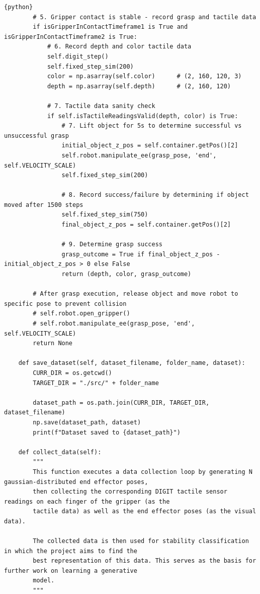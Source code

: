 \documentclass[11pt, a4paper]{report}
\begin{document}
\begin{lstlisting}{python}
        # 5. Gripper contact is stable - record grasp and tactile data
        if isGripperInContactTimeframe1 is True and isGripperInContactTimeframe2 is True:
            # 6. Record depth and color tactile data
            self.digit_step()
            self.fixed_step_sim(200)
            color = np.asarray(self.color)      # (2, 160, 120, 3)
            depth = np.asarray(self.depth)      # (2, 160, 120)

            # 7. Tactile data sanity check
            if self.isTactileReadingsValid(depth, color) is True:
                # 7. Lift object for 5s to determine successful vs unsuccessful grasp
                initial_object_z_pos = self.container.getPos()[2]
                self.robot.manipulate_ee(grasp_pose, 'end', self.VELOCITY_SCALE)
                self.fixed_step_sim(200)

                # 8. Record success/failure by determining if object moved after 1500 steps
                self.fixed_step_sim(750)
                final_object_z_pos = self.container.getPos()[2]

                # 9. Determine grasp success
                grasp_outcome = True if final_object_z_pos - initial_object_z_pos > 0 else False
                return (depth, color, grasp_outcome)
        
        # After grasp execution, release object and move robot to specific pose to prevent collision
        # self.robot.open_gripper()
        # self.robot.manipulate_ee(grasp_pose, 'end', self.VELOCITY_SCALE)
        return None

    def save_dataset(self, dataset_filename, folder_name, dataset):
        CURR_DIR = os.getcwd()
        TARGET_DIR = "./src/" + folder_name

        dataset_path = os.path.join(CURR_DIR, TARGET_DIR, dataset_filename)
        np.save(dataset_path, dataset)
        print(f"Dataset saved to {dataset_path}")

    def collect_data(self):
        """
        This function executes a data collection loop by generating N gaussian-distributed end effector poses,
        then collecting the corresponding DIGIT tactile sensor readings on each finger of the gripper (as the 
        tactile data) as well as the end effector poses (as the visual data).

        The collected data is then used for stability classification in which the project aims to find the
        best representation of this data. This serves as the basis for further work on learning a generative
        model.
        """      


\end{lstlisting}
\end{document}
